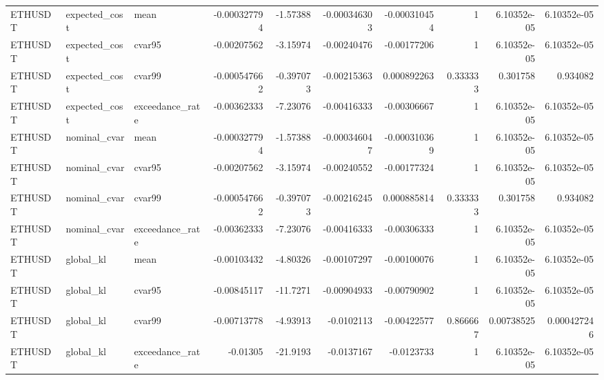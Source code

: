 \begin{table}[!htbp]
\begin{tabular}{lllrrrrrrr}
ETHUSDT & expected\_cost & mean & -0.000327794 & -1.57388 & -0.000346303 & -0.000310454 & 1 & 6.10352e-05 & 6.10352e-05 \\
ETHUSDT & expected\_cost & cvar95 & -0.00207562 & -3.15974 & -0.00240476 & -0.00177206 & 1 & 6.10352e-05 & 6.10352e-05 \\
ETHUSDT & expected\_cost & cvar99 & -0.000547662 & -0.397073 & -0.00215363 & 0.000892263 & 0.333333 & 0.301758 & 0.934082 \\
ETHUSDT & expected\_cost & exceedance\_rate & -0.00362333 & -7.23076 & -0.00416333 & -0.00306667 & 1 & 6.10352e-05 & 6.10352e-05 \\
ETHUSDT & nominal\_cvar & mean & -0.000327794 & -1.57388 & -0.000346047 & -0.000310369 & 1 & 6.10352e-05 & 6.10352e-05 \\
ETHUSDT & nominal\_cvar & cvar95 & -0.00207562 & -3.15974 & -0.00240552 & -0.00177324 & 1 & 6.10352e-05 & 6.10352e-05 \\
ETHUSDT & nominal\_cvar & cvar99 & -0.000547662 & -0.397073 & -0.00216245 & 0.000885814 & 0.333333 & 0.301758 & 0.934082 \\
ETHUSDT & nominal\_cvar & exceedance\_rate & -0.00362333 & -7.23076 & -0.00416333 & -0.00306333 & 1 & 6.10352e-05 & 6.10352e-05 \\
ETHUSDT & global\_kl & mean & -0.00103432 & -4.80326 & -0.00107297 & -0.00100076 & 1 & 6.10352e-05 & 6.10352e-05 \\
ETHUSDT & global\_kl & cvar95 & -0.00845117 & -11.7271 & -0.00904933 & -0.00790902 & 1 & 6.10352e-05 & 6.10352e-05 \\
ETHUSDT & global\_kl & cvar99 & -0.00713778 & -4.93913 & -0.0102113 & -0.00422577 & 0.866667 & 0.00738525 & 0.000427246 \\
ETHUSDT & global\_kl & exceedance\_rate & -0.01305 & -21.9193 & -0.0137167 & -0.0123733 & 1 & 6.10352e-05 & 6.10352e-05 \\
\bottomrule
\end{tabular}
\end{table}
